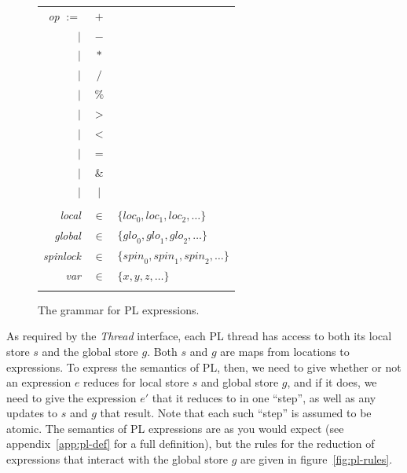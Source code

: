 \documentclass[12pt,a4paper,twoside,openright]{report}
\begin{document}
\begin{figure}
\begin{tabular}{rl}
	\end{tabular}
	\qquad\quad
	\begin{tabular}{rcl}
		\textit{op} $:=$ & $+$ &\\
		$\vert$ & $-$ &\\
		$\vert$ & $\ast$ &\\
		$\vert$ & $/$ &\\
		$\vert$ & $\%$ &\\
		$\vert$ & $>$ &\\
		$\vert$ & $<$ &\\
		$\vert$ & $=$ &\\
		$\vert$ & $\&$ &\\
		$\vert$ & $\mid$ &\\
		& &\\
		\textit{local} & $\in$ &
			$\{\textit{loc}_0, \textit{loc}_1, \textit{loc}_2, \ldots\}$ \\
		\textit{global} & $\in$ &
			$\{\textit{glo}_0, \textit{glo}_1, \textit{glo}_2, \ldots\}$ \\
		\textit{spinlock} & $\in$ &
			$\{\textit{spin}_0, \textit{spin}_1, \textit{spin}_2, \ldots\}$ \\
		\textit{var} & $\in$ & $\{x, y, z, \ldots\}$ \\
		& & \\
	\end{tabular}
	\caption{The grammar for PL expressions.}
	\label{fig:pl-expressions}
\end{figure}

As required by the \emph{Thread} interface, each
PL thread has access to both its local store $s$
and the global store $g$. Both $s$ and $g$ are
maps from locations to expressions.
To express the semantics
of PL, then, we need to give whether or not an
expression $e$ reduces for local store $s$ and
global store $g$, and if it does, we need to give
the expression $e'$ that it reduces to in one ``step'',
as well as any updates to $s$ and $g$ that result.
Note that each such ``step'' is assumed to be atomic.
The semantics of PL expressions are as you would expect
(see appendix~\ref{app:pl-def} for a full definition), but
the rules for the reduction of expressions that interact
with the global store $g$ are given in figure~\ref{fig:pl-rules}.
\end{document}
